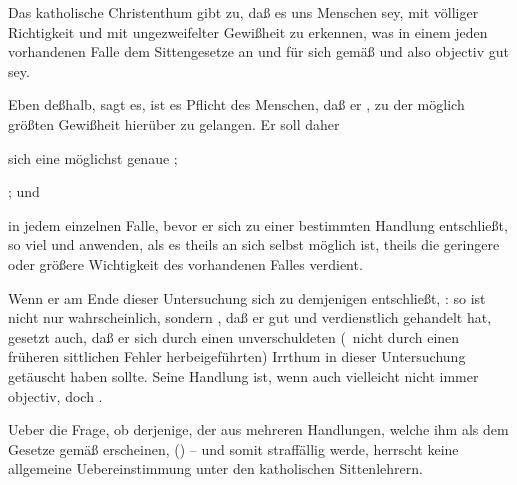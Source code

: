 \begin{aufza}
\item Das katholische Christenthum gibt zu, daß es uns Menschen  sey, mit völliger Richtigkeit und mit ungezweifelter Gewißheit zu erkennen, was in einem jeden vorhandenen Falle dem Sittengesetze an und für sich gemäß und also objectiv gut sey.
\item Eben deßhalb, sagt es, ist es Pflicht des Menschen, daß er , zu der möglich größten Gewißheit hierüber zu gelangen. Er soll daher
\begin{aufzb}
\item {}
\item sich eine möglichst genaue ;
\item {}; und
\item in jedem einzelnen Falle, bevor er sich zu einer bestimmten Handlung entschließt, so viel  und  anwenden, als es theils an sich selbst möglich ist, theils die geringere oder größere Wichtigkeit des vorhandenen Falles verdient.
\end{aufzb}
\item Wenn er am Ende dieser Untersuchung sich zu demjenigen entschließt, : so ist nicht nur wahrscheinlich, sondern , daß er gut und verdienstlich gehandelt hat, gesetzt auch, daß er sich durch einen unverschuldeten (\dh\  nicht durch einen früheren sittlichen Fehler herbeigeführten) Irrthum in dieser Untersuchung getäuscht haben sollte. Seine Handlung ist, wenn auch vielleicht nicht immer objectiv, doch .
\item Ueber die Frage, ob derjenige, der aus mehreren Handlungen, welche ihm als dem Gesetze gemäß erscheinen,  () --  und somit straffällig werde, herrscht keine allgemeine Uebereinstimmung unter den katholischen Sittenlehrern.

\end{aufza}
